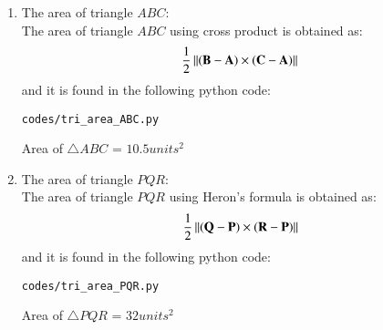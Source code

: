 \begin{enumerate}[label=\thesection.\arabic*.,ref=\thesection.\theenumi]
\item The area of triangle $ABC$: \\
\solution The area of triangle $ABC$ using cross product is obtained as:
$$\frac{1}{2}\left\lVert(\mathbf{B}-\mathbf{A})\times(\mathbf{C}-\mathbf{A})\right\rVert$$
and it is found in the following python code:
\begin{lstlisting}
codes/tri_area_ABC.py
\end{lstlisting} 

Area of $\triangle{ABC}$ = $10.5 units^2$

\item The area of triangle $PQR$: \\
\solution The area of triangle $PQR$ using Heron's formula is obtained as:
$$\frac{1}{2}\left\lVert(\mathbf{Q}-\mathbf{P})\times(\mathbf{R}-\mathbf{P})\right\rVert$$
and it is found in the following python code:
\begin{lstlisting}
codes/tri_area_PQR.py
\end{lstlisting} 

Area of $\triangle{PQR}$ = $32 units^2$

\end{enumerate}